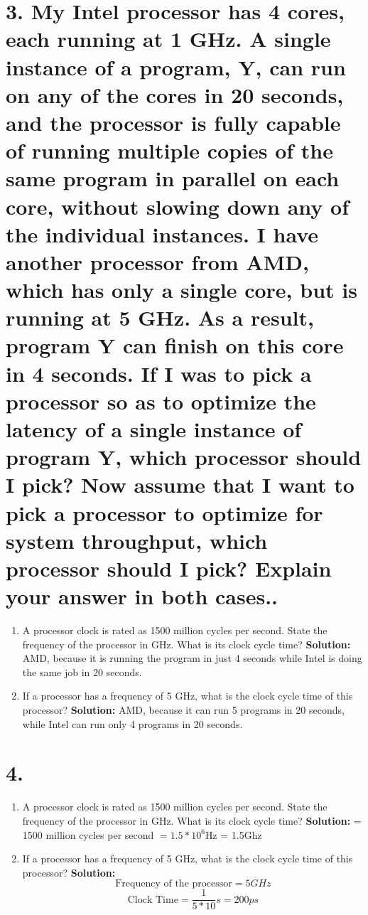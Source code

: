 \documentclass[11pt]{article}
\newenvironment{qparts}{\begin{enumerate}[{(}a{)}]}{\end{enumerate}}
\begin{document}
\section*{3. My Intel processor has 4 cores, each running at 1 GHz. A single instance of a program, Y, can run on any of the cores in 20 seconds, and the processor is fully capable of running multiple copies of the same program in parallel on each core, without slowing down any of the individual instances. I have another processor from AMD, which has only a single core, but is running at 5 GHz. As a result, program Y can finish on this core in 4 seconds. If I was to pick a processor so as to optimize the latency of a single instance of program Y, which processor should I pick? Now assume that I want to pick a processor to optimize for system throughput, which processor should I pick? Explain your answer in both cases..
}
\begin{qparts}
\item
A processor clock is rated as 1500 million cycles per second. State the frequency of the processor in GHz. What is its clock cycle time?
\newline
\textbf{Solution: }
AMD, because it is running the program in just 4 seconds while Intel is doing the same job in 20 seconds.
\item
If a processor has a frequency of 5 GHz, what is the clock cycle time of this processor?
\newline
\textbf{Solution: } AMD, because it can run 5 programs in 20 seconds, while Intel can run only 4 programs in 20 seconds.


\end{qparts}

\section*{4.
}
\begin{qparts}
\item
A processor clock is rated as 1500 million cycles per second. State the frequency of the processor in GHz. What is its clock cycle time?
\newline
\textbf{Solution: }
= 1500 million cycles per second
$= 1.5 * 10 ^{6}$Hz = 1.5Ghz

\item
If a processor has a frequency of 5 GHz, what is the clock cycle time of this processor? 
\newline
\textbf{Solution: } \[\text{Frequency of the processor} = 5GHz\]
\[\text{Clock Time} = \frac{1}{5*10}s = 200ps\]

\end{qparts}
\end{document}
